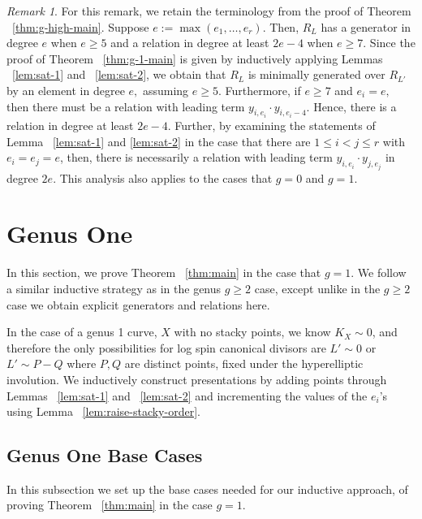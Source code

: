 \documentclass{amsart}
\theoremstyle{plain}
\theoremstyle{definition}
\theoremstyle{remark}
\newtheorem{rem}[thm]{Remark}
\numberwithin{equation}{section}
\newcommand\ssec{\subsection}
\newcommand{\halfcan}{L}
\begin{document}
\begin{rem}
\label{rem:genus-2-explicit-bound}
For this remark, we retain the terminology from the proof of Theorem ~\ref{thm:g-high-main}.
Suppose $e :=  \max(e_1,\ldots, e_r).$ Then, $R_\halfcan$ has a generator in degree $e$ when $e \geq 5$ and a relation in degree at least $2e-4$ when $e \geq 7$. Since the proof of Theorem ~\ref{thm:g-1-main} is given by inductively 
applying Lemmas ~\ref{lem:sat-1} and ~\ref{lem:sat-2}, we obtain that $R_\halfcan$ is minimally generated over $R_{L'}$ by an element in degree $e,$ assuming $e \geq 5$. Furthermore, if $e \geq 7$ and $e_i = e,$ 
then there must be a relation with leading term $y_{i,e_i} \cdot y_{i,e_i-4}.$ Hence, there is a relation in degree at least $2e - 4$. 
Further, by examining the statements of Lemma ~\ref{lem:sat-1} and \ref{lem:sat-2} in the case that there are $1 \leq i < j \leq r$ with $e_i = e_j = e$, then, there is necessarily a relation with leading term $y_{i, e_i} \cdot y_{j, e_j}$ in degree $2e$. This analysis also applies to the cases that $g = 0$ and $g = 1$.
\end{rem}




\section{Genus One}
\label{sec:g-1}

In this section, we prove Theorem ~\ref{thm:main} in the case that $g = 1$.  We follow a similar inductive strategy as in the genus $g\geq 2$ case, except unlike in the $g \geq 2$ case we obtain explicit generators and relations here.

In the case of a genus 1 curve, $X$ with no stacky points, we know $K_X \sim 0$, and therefore the only possibilities for log spin canonical divisors are $\halfcan' \sim 0$ or $\halfcan' \sim P - Q$ where $P, Q$ are distinct points, fixed  under the hyperelliptic involution. We inductively construct presentations by adding points through Lemmas ~\ref{lem:sat-1} and ~\ref{lem:sat-2} and incrementing the values of the $e_i$'s using Lemma ~\ref{lem:raise-stacky-order}.

\ssec{Genus One Base Cases}
\label{ssec:g-1_base}
In this subsection we set up the base cases needed for our inductive approach, of proving Theorem ~\ref{thm:main} in the case $g = 1$.
\end{document}
